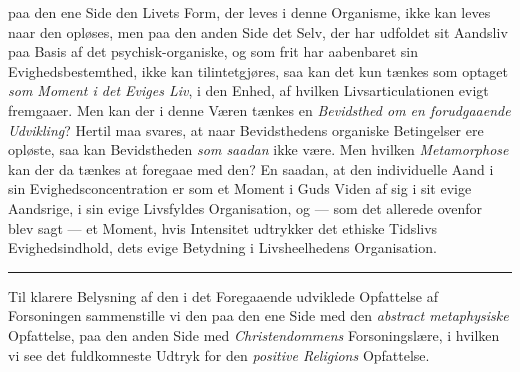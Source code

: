 paa den ene Side den Livets Form, der leves i denne Organisme, ikke kan leves naar
den opløses, men paa den anden Side det Selv, der har udfoldet sit Aandsliv paa
Basis af det psychisk-organiske, og som frit har aabenbaret sin
Evighedsbestemthed, ikke kan tilintetgjøres, saa kan det kun tænkes som optaget
\emph{som Moment i det Eviges Liv}, i den Enhed, af hvilken Livsarticulationen
evigt fremgaaer. Men kan der i denne Væren tænkes en \emph{Bevidsthed om en
forudgaaende Udvikling}? Hertil maa svares, at naar Bevidsthedens organiske
Betingelser ere opløste, saa kan Bevidstheden \emph{som saadan} ikke være. Men
hvilken \emph{Metamorphose} kan der da tænkes at foregaae med den? En saadan, at
den individuelle Aand i sin Evighedsconcentration er som et Moment i Guds Viden af
sig i sit evige Aandsrige, i sin evige Livsfyldes Organisation,
 og --- som det allerede ovenfor blev sagt --- et Moment, hvis Intensitet
udtrykker det ethiske Tidslivs Evighedsindhold, dets evige Betydning i
Livsheelhedens Organisation.

\begin{center}\rule{2cm}{0.4pt}\end{center}

Til klarere Belysning af den i det Foregaaende udviklede Opfattelse af
Forsoningen sammenstille vi den paa den ene Side med den \emph{abstract
metaphysiske} Opfattelse, paa den anden Side med \emph{Christendommens}
Forsoningslære, i hvilken vi see det fuldkomneste Udtryk for den \emph{positive
Religions} Opfattelse.

